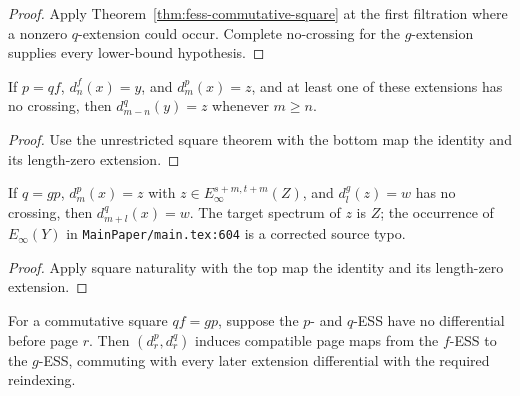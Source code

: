 \begin{proof}
  Apply Theorem~\ref{thm:fess-commutative-square} at the first filtration where
  a nonzero $q$-extension could occur.  Complete no-crossing for the
  $g$-extension supplies every lower-bound hypothesis.
\end{proof}

\begin{corollary}
  \label{cor:fess-triangle-shift}
  \notready
  If $p=qf$, $d_n^f(x)=y$, and $d_m^p(x)=z$, and at least one of these
  extensions has no crossing, then $d_{m-n}^q(y)=z$ whenever $m\ge n$.
\end{corollary}

\begin{proof}
  Use the unrestricted square theorem with the bottom map the identity and
  its length-zero extension.
\end{proof}

\begin{corollary}
  \label{cor:fess-composition}
  \notready
  If $q=gp$, $d_m^p(x)=z$ with
  $z\in E_\infty^{s+m,t+m}(Z)$, and $d_l^g(z)=w$ has no crossing, then
  $d_{m+l}^q(x)=w$.  The target spectrum of $z$ is $Z$; the occurrence of
  $E_\infty(Y)$ in \texttt{MainPaper/main.tex:604} is a corrected source typo.
\end{corollary}

\begin{proof}
  Apply square naturality with the top map the identity and its length-zero
  extension.
\end{proof}

\begin{corollary}
  \label{cor:fess-map-of-stable-pages}
  \notready
  For a commutative square $qf=gp$, suppose the $p$- and $q$-ESS have no
  differential before page $r$.  Then $(d_r^p,d_r^q)$ induces compatible page
  maps from the $f$-ESS to the $g$-ESS, commuting with every later extension
  differential with the required reindexing.
\end{corollary}

